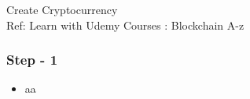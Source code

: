 \begin{frame}[fragile]\frametitle{}
\begin{center}
{\Large Create Cryptocurrency}\\
{\small Ref: Learn with Udemy Courses : Blockchain A-z}
\end{center}
\end{frame}

\begin{frame}[fragile]\frametitle{Step - 1}
\begin{itemize}
\item aa
\end{itemize}
\end{frame}
